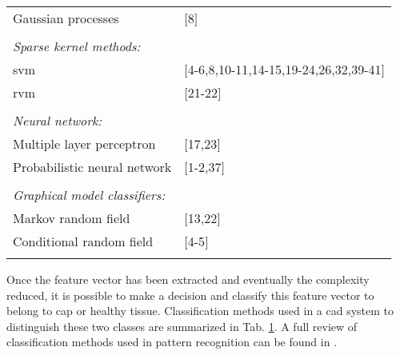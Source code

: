 \begin{table}
\begin{tabular}{p{.60\linewidth} p{.30\linewidth}}
		\quad Gaussian processes & $[$8$]$ \\ \\ [-1.5ex]
		\textit{Sparse kernel methods:} & \\
		\quad \acs{svm} & $[$4-6,8,10-11,14-15,19-24,26,32,39-41$]$ \\
		\quad \acs{rvm} & $[$21-22$]$ \\ \\ [-1.5ex]
		\textit{Neural network:} & \\ 
		\quad Multiple layer perceptron & $[$17,23$]$ \\
		\quad Probabilistic neural network & $[$1-2,37$]$ \\ \\ [-1.5ex]
		\textit{Graphical model classifiers:} & \\
		\quad Markov random field & $[$13,22$]$ \\
		\quad Conditional random field & $[$4-5$]$ \\ \\ [-1.5ex]
		\hline
	\end{tabular}
	\label{tab:class}
\end{table}

Once the feature vector has been extracted and eventually the complexity reduced, it is possible to make a decision and classify this feature vector to belong to \ac{cap} or healthy tissue. Classification methods used in a \ac{cad} system to distinguish these two classes are summarized in Tab. \ref{tab:class}. A full review of classification methods used in pattern recognition can be found in \cite{Bishop2006}.

